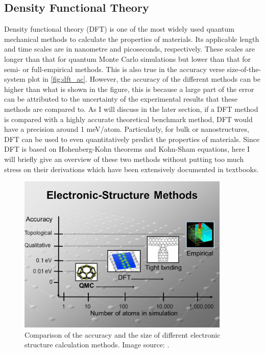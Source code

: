 \subsection{Density Functional Theory}
%
Density functional theory (DFT) is one of the most widely used quantum mechanical methods to calculate the properties of materials. Its applicable length and time scales are in nanometre and picoseconds, respectively. These scales are longer than that for quantum Monte Carlo simulations but lower than that for semi- or full-empirical methods. This is also true in the accuracy verse size-of-the-system plot in \autoref{fig:dft_ac}. However, the accuracy of the different methods can be higher than what is shown in the figure, this is because a large part of the error can be attributed to the uncertainty of the experimental results that these methods are compared to\cite{Kirklin2015}. As I will discuss in the later section, if a DFT method is compared with a highly accurate theoretical benchmark method, DFT would have a precision around 1 meV/atom. Particularly, for bulk or nanostructures, DFT can be used to even quantitatively predict the properties of materials. Since DFT is based on Hohenberg-Kohn theorems\cite{Hohenberg1964} and Kohn-Sham equations\cite{Kohn1965}, here I will briefly give an overview of these two methods without putting too much stress on their derivations which have been extensively documented in textbooks. 
%
\begin{figure}[htbp!] 
\centering  
\includegraphics[width=0.9\textwidth]{dft1.jpg}
\caption[Comparison of different electronic structure calculation methods]{ Comparison of the accuracy and the size of different electronic structure calculation methods. Image source: \cite{dft_ac}.}  
\label{fig:dft_ac}
\end{figure} 
